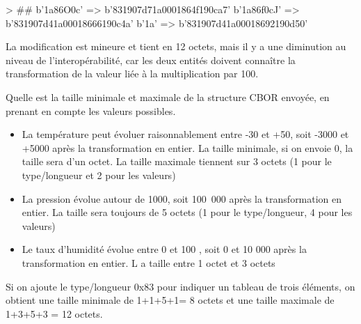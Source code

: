 

\begin{termc}[backgroundcolor=\color{palerod}, language=json, basicstyle=\ttfamily\tiny, escapechar=#]
> ##
b'\x1a\x86O\x0c' => b'831907d71a0001864f190ca7'
b'\x1a\x86f\x0cJ' => b'831907d41a00018666190c4a'
b'\x1a\rP' => b'831907d41a00018692190d50'
\end{termc}

La modification est mineure et tient en 12 octets, mais il y a une diminution au niveau de l'interopérabilité, car les deux entités doivent connaître la transformation de la valeur liée à la multiplication par 100.

{ Quelle est la taille minimale et maximale de la structure CBOR envoyée, en prenant en compte les valeurs possibles.
}
{
\begin{itemize}
    \item La température peut évoluer raisonnablement entre -30 et +50, soit -3000 et +5000 après la transformation en entier. La taille minimale, si on envoie 0, la taille sera d'un octet. La taille maximale tiennent sur 3 octets (1 pour le type/longueur et 2 pour les valeurs) 
    \item La pression évolue autour de 1000, soit 100~000 après la transformation en entier. La taille sera toujours de 5 octets (1 pour le type/longueur, 4 pour les valeurs)
    \item Le taux d'humidité évolue entre 0 et 100 , soit 0 et 10 000 après la transformation en entier. L a taille entre 1 octet et 3 octets
\end{itemize}

Si on ajoute le type/longueur 0x83 pour indiquer un tableau de trois éléments, on obtient une taille minimale de 1+1+5+1= 8 octets et une taille maximale de 1+3+5+3 = 12 octets.
}

